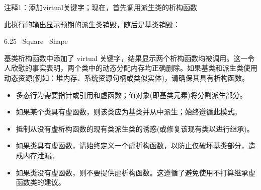 {\footnotesize
注释1：添加virtual关键字；现在，首先调用派生类的析构函数
}

此执行的输出显示预期的派生类销毁，随后是基类销毁：

\begin{shell}
6.25
~Square
~Shape
\end{shell}

基类析构函数中添加了 virtual 关键字，结果显示两个析构函数均被调用。这一令人欣慰的事实表明，两个类中的动态分配内存均正确删除。如果基类和派生类使用动态资源(例如：堆内存、系统资源句柄或类似实体)，请确保其具有析构函数。


\begin{itemize}
\item
多态行为需要指针或引用和虚函数；值对象(即基类元素)将分割派生部分。

\item
如果某个类具有虚函数，则该类应为基类并从中派生；始终遵循此模式。

\item
抵制从没有虚析构函数的现有类派生类的诱惑(或修复该现有类以进行继承)。

\item
如果类具有虚函数，请始终定义一个虚析构函数，以防止仅破坏基类部分，造成内存泄漏。

\item
如果类没有虚函数，则不要提供虚析构函数。这遵循了避免使用不打算继承虚函数类的建议。
\end{itemize}








